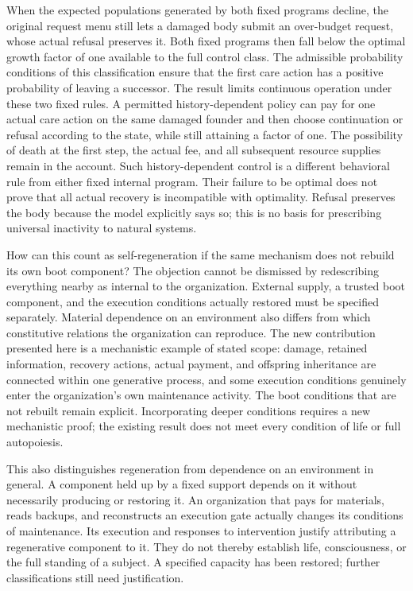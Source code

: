 \documentclass[
  english,
  11pt,
  oneside]{book}
\begin{document}
When the expected populations generated by both fixed programs decline, the original request menu still lets a damaged body submit an over-budget request, whose actual refusal preserves it. Both fixed programs then fall below the optimal growth factor of one available to the full control class. The admissible probability conditions of this classification ensure that the first care action has a positive probability of leaving a successor. The result limits continuous operation under these two fixed rules. A permitted history-dependent policy can pay for one actual care action on the same damaged founder and then choose continuation or refusal according to the state, while still attaining a factor of one. The possibility of death at the first step, the actual fee, and all subsequent resource supplies remain in the account. Such history-dependent control is a different behavioral rule from either fixed internal program. Their failure to be optimal does not prove that all actual recovery is incompatible with optimality. Refusal preserves the body because the model explicitly says so; this is no basis for prescribing universal inactivity to natural systems.

How can this count as self-regeneration if the same mechanism does not rebuild its own boot component? The objection cannot be dismissed by redescribing everything nearby as internal to the organization. External supply, a trusted boot component, and the execution conditions actually restored must be specified separately. Material dependence on an environment also differs from which constitutive relations the organization can reproduce. The new contribution presented here is a mechanistic example of stated scope: damage, retained information, recovery actions, actual payment, and offspring inheritance are connected within one generative process, and some execution conditions genuinely enter the organization's own maintenance activity. The boot conditions that are not rebuilt remain explicit. Incorporating deeper conditions requires a new mechanistic proof; the existing result does not meet every condition of life or full autopoiesis.

This also distinguishes regeneration from dependence on an environment in general. A component held up by a fixed support depends on it without necessarily producing or restoring it. An organization that pays for materials, reads backups, and reconstructs an execution gate actually changes its conditions of maintenance. Its execution and responses to intervention justify attributing a regenerative component to it. They do not thereby establish life, consciousness, or the full standing of a subject. A specified capacity has been restored; further classifications still need justification.
\end{document}
